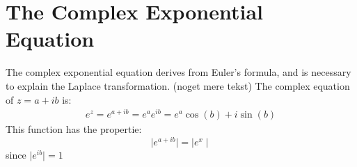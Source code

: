 \section{The Complex Exponential Equation}
The complex exponential equation derives from Euler’s formula, and is necessary to explain the Laplace transformation. (noget mere tekst)
The complex equation of $z=a+ib$ is:
\begin{align}
e^z=e^{a+ib}=e^ae^{ib}=e^a\cos(b)+i\sin(b)
\end{align}
This function has the propertie:
$$\mid e^{a+ib} \mid = \mid e^x \mid$$
since $\mid e^{ib} \mid = 1$
